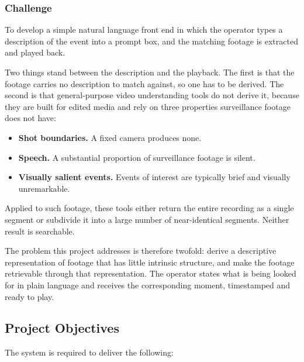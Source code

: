 \subsubsection*{Challenge}

To develop a simple natural language front end in which the operator types a description
of the event into a prompt box, and the matching footage is extracted and played back.

Two things stand between the description and the playback. The first is that the footage
carries no description to match against, so one has to be derived. The second is that
general-purpose video understanding tools do not derive it, because they are built for
edited media and rely on three properties surveillance footage does not have:

\begin{itemize}
  \item \textbf{Shot boundaries.} A fixed camera produces none.
  \item \textbf{Speech.} A substantial proportion of surveillance footage is silent.
  \item \textbf{Visually salient events.} Events of interest are typically brief and
        visually unremarkable.
\end{itemize}

Applied to such footage, these tools either return the entire recording as a single
segment or subdivide it into a large number of near-identical segments. Neither result
is searchable.

The problem this project addresses is therefore twofold: derive a descriptive
representation of footage that has little intrinsic structure, and make the footage
retrievable through that representation. The operator states what is being looked for in
plain language and receives the corresponding moment, timestamped and ready to play.

\subsection{Project Objectives}

The system is required to deliver the following:

